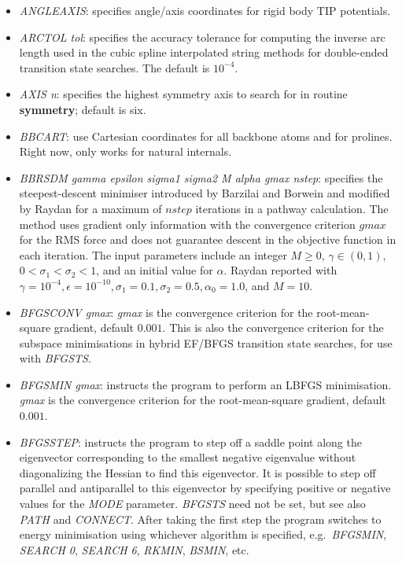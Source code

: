 \documentclass[12pt,a4paper,dvips]{article}
\begin{document}
\begin{itemize}
\item {\it ANGLEAXIS}: specifies angle/axis coordinates for rigid body TIP potentials.

\item {\it ARCTOL tol\/}: specifies the accuracy tolerance for computing the
  inverse arc length used in the cubic spline interpolated string methods for
  double-ended transition state searches. The default is $10^{-4}$.

\item {\it AXIS n}: specifies the highest symmetry axis to search for in
routine {\bf symmetry}; default is six.

\item {\it BBCART\/}: use Cartesian coordinates for all backbone atoms and for
  prolines. Right now, only works for natural internals.

\item {\it BBRSDM gamma epsilon sigma1 sigma2 M alpha gmax nstep}: specifies
the steepest-descent minimiser introduced by Barzilai and Borwein \cite{BB-IMAJNA-1988}
and modified by Raydan \cite{Raydan-SIAMJO-1997} for a maximum of $nstep$ iterations
in a pathway calculation. The method uses 
gradient only information with the convergence criterion $gmax$ for the RMS force
and does not guarantee descent in the objective function in each iteration.
The input parameters include an integer $M \ge 0$, $\gamma \in (0,1)$, 
$0 < \sigma_{1} < \sigma_{2} < 1$, and an initial value for $\alpha$. Raydan reported
with $\gamma = 10^{-4}, \epsilon = 10^{-10},
\sigma_{1} = 0.1, \sigma_{2} = 0.5, \alpha_{0} = 1.0$, and $M = 10$.   

\item {\it BFGSCONV gmax\/}: 
{\it gmax\/} is the convergence criterion
for the root-mean-square gradient, default $0.001$.
This is also the convergence criterion
for the subspace minimisations in hybrid EF/BFGS transition state searches, for use with {\it BFGSTS\/}.

\item {\it BFGSMIN\/ gmax}: instructs the program to perform an LBFGS minimisation. 
{\it gmax\/} is the convergence criterion
for the root-mean-square gradient, default $0.001$. 

\item {\it BFGSSTEP\/}: instructs the program to step off a saddle point along the
eigenvector corresponding to the smallest negative eigenvalue without
diagonalizing the Hessian to find this eigenvector. It is possible to step off
parallel and antiparallel to this eigenvector by specifying positive or negative values
for the {\it MODE\/} parameter. {\it BFGSTS\/} need not be set, but see also
{\it PATH\/} and {\it CONNECT\/}. After taking the first step the program switches to
energy minimisation using whichever algorithm is specified, e.g.~{\it BFGSMIN\/},
{\it SEARCH 0}, {\it SEARCH 6}, {\it RKMIN\/}, {\it BSMIN\/}, etc.


\end{itemize}
\end{document}
